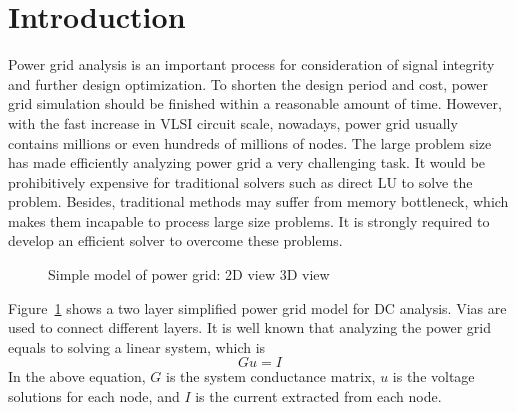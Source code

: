 \documentclass{sig-alternate}
\begin{document}
\section{Introduction}
Power grid analysis is an important process for consideration of signal integrity and further design 
optimization. To shorten the design period and cost, power grid simulation should be finished within a reasonable amount of time. 
However, with the fast increase in VLSI circuit scale, nowadays, power grid usually contains millions or even hundreds of millions 
of nodes. The large problem size has made efficiently analyzing power grid a very challenging task. It would be prohibitively 
expensive for traditional solvers such as direct LU to solve the problem. Besides, traditional methods may suffer from memory 
bottleneck, which makes them incapable to process large size problems. It is strongly required to develop an efficient 
solver to overcome these problems.
	\begin{figure}[htbp]
	  \caption{Simple model of power grid: 
	   2D view
	   3D view}
	  \label{pg_model}
	\end{figure}
Figure~\ref{pg_model} shows a two layer simplified power grid model for DC analysis. Vias are used to 
	connect different layers. It is well known that analyzing the power grid equals to solving a linear system, which is 
	\begin{equation}\label{eq1}
		Gu=I
	\end{equation}
In the above equation, $G$ is the system conductance matrix, $u$ is the voltage solutions for each node, and $I$ is the current 
extracted from each node.
\end{document}
